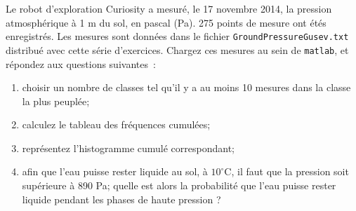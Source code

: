 Le robot d'exploration Curiosity a mesuré, le 17 novembre 2014, la pression atmosphérique à 1 m du sol, en pascal (Pa). 275 points de mesure ont étés enregistrés. Les mesures sont données dans le fichier \texttt{GroundPressureGusev.txt} distribué avec cette série d'exercices. Chargez ces mesures au sein de \texttt{matlab}, et répondez aux questions suivantes~:
\begin{enumerate}
\item choisir un nombre de classes tel qu'il y a au moins 10 mesures dans la classe la plus peuplée;
\item calculez le tableau des fréquences cumulées;
\item représentez l'histogramme cumulé correspondant;
\item afin que l'eau puisse rester liquide au sol, à $10^{\circ}$C, il faut que la pression soit supérieure à 890 Pa; quelle est alors la probabilité que l'eau puisse rester liquide pendant les phases de haute pression ?
\end{enumerate}

%